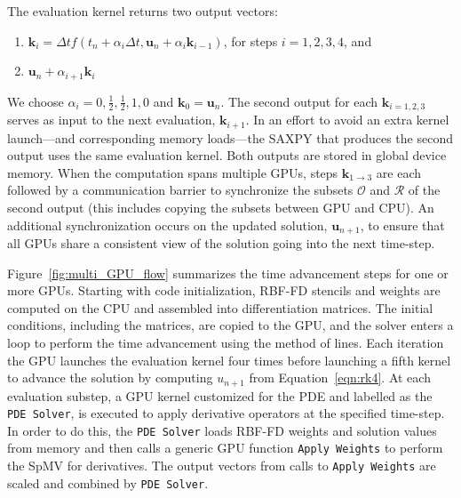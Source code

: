 \documentclass{report}
\begin{document}
 The evaluation kernel returns two output vectors: 
\begin{enumerate} 
\item $\mathbf{k}_i = \Delta t f(t_n + \alpha_{i} \Delta t, \mathbf{u}_n + \alpha_{i} \mathbf{k}_{i-1})$, for steps $i=1,2,3,4$, and
\item  $\mathbf{u}_n + \alpha_{i+1} \mathbf{k}_i$
\end{enumerate} 
We choose $\alpha_{i}=0, \frac{1}{2}, \frac{1}{2}, 1, 0$ and $\mathbf{k}_{0} = \mathbf{u}_n$. The second output for each $\mathbf{k}_{i=1,2,3}$ serves as input to the next evaluation, $\mathbf{k}_{i+1}$. In an effort to avoid an extra kernel launch---and corresponding memory loads---the SAXPY that produces the second output uses the same evaluation kernel. Both outputs are stored in global device memory. When the computation spans multiple GPUs, steps $\mathbf{k}_{1\rightarrow3}$ are each followed by a communication barrier to synchronize the subsets $\mathcal{O}$ and $\mathcal{R}$ of the second output (this includes copying the subsets between GPU and CPU). An additional synchronization occurs on the updated solution, $\mathbf{u}_{n+1}$, to ensure that all GPUs share a consistent view of the solution going into the next time-step.

Figure~\ref{fig:multi_GPU_flow} summarizes the time advancement steps for one or more GPUs. Starting with code initialization, RBF-FD stencils and weights are computed on the CPU and assembled into differentiation matrices. The initial conditions, including the matrices, are copied to the GPU, and the solver enters a loop to perform the time advancement using the method of lines. Each iteration the GPU launches the evaluation kernel four times before launching a fifth kernel to advance the solution by computing $u_{n+1}$ from Equation~\ref{eqn:rk4}. At each evaluation substep, a GPU kernel customized for the PDE and labelled as the \texttt{PDE Solver}, is executed to apply derivative operators at the specified time-step. In order to do this, the \texttt{PDE Solver} loads RBF-FD weights and solution values from memory and then calls a generic GPU function \texttt{Apply Weights} to perform the SpMV for derivatives. The output vectors from calls to \texttt{Apply Weights} are scaled and combined by \texttt{PDE Solver}. %
\end{document}
